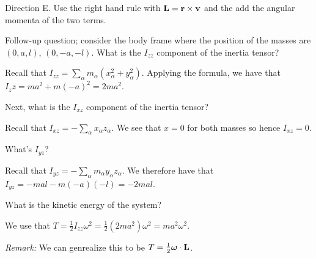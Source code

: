 \documentclass[../PHYS306Notes.tex]{subfiles}
\begin{document}
\begin{s}
Direction E. Use the right hand rule with $\mathbf{L} = \mathbf{r} \times \mathbf{v}$ and the add the angular momenta of the two terms.
\end{s}
Follow-up question; consider the body frame where the position of the masses are $(0, a, l)$, $(0, -a, -l)$. What is the $I_{zz}$ component of the inertia tensor?
\begin{s}
Recall that $I_{zz} = \sum_\alpha m_\alpha(x_\alpha^2 + y_\alpha^2)$. Applying the formula, we have that $I_zz = ma^2 + m(-a)^2 = 2ma^2$.
\end{s}
\noindent Next, what is the $I_{xz}$ component of the inertia tensor?
\begin{s}
Recall that $I_{xz} = -\sum_\alpha x_\alpha z_\alpha$. We see that $x = 0$ for both masses so hence $I_{xz} = 0$.
\end{s}
\noindent What's $I_{yz}$?
\begin{s}
Recall that $I_{yz} = -\sum_\alpha m_\alpha y_\alpha z_\alpha$. We therefore have that $I_{yz} = -mal - m(-a)(-l) = -2mal$.
\end{s}
\noindent What is the kinetic energy of the system?
\begin{s}
We use that $T = \frac{1}{2}I_{zz}\omega^2 = \frac{1}{2}(2ma^2)\omega^2 = ma^2\omega^2$.
\end{s}
\noindent \textit{Remark:} We can genrealize this to be $T = \frac{1}{2}\bm{\omega} \cdot \mathbf{L}$.
\end{document}

